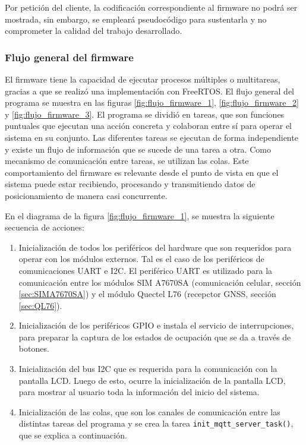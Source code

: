 Por petición del cliente, la codificación correspondiente al firmware no podrá ser mostrada, sin embargo, se empleará pseudocódigo para sustentarla y no comprometer la calidad del trabajo desarrollado. 

\subsubsection{Flujo general del firmware}

El firmware tiene la capacidad de ejecutar procesos múltiples o multitareas, gracias a que se realizó una implementación con FreeRTOS. El flujo general del programa se muestra en las figuras \ref{fig:flujo_firmware_1}, \ref{fig:flujo_firmware_2} y \ref{fig:flujo_firmware_3}. El programa se dividió en tareas, que son funciones puntuales que ejecutan una acción concreta y colaboran entre sí para operar el sistema en su conjunto. Las diferentes tareas se ejecutan de forma independiente y existe un flujo de información que se sucede de una tarea a otra. Como mecanismo de comunicación entre tareas, se utilizan las colas. Este comportamiento del firmware es relevante desde el punto de vista en que el sistema puede estar recibiendo, procesando y transmitiendo datos de posicionamiento de manera casi concurrente.

En el diagrama de la figura \ref{fig:flujo_firmware_1}, se muestra la siguiente secuencia de acciones: 

\begin{enumerate}
\item Inicialización de todos los periféricos del hardware que son requeridos para operar con los módulos externos. Tal es el caso de los periféricos de comunicaciones UART e I2C. El periférico UART es utilizado para la comunicación entre los módulos SIM A7670SA \citep{A7670SA} (comunicación celular, sección \ref{sec:SIMA7670SA}) y el módulo Quectel L76 (recepctor GNSS, sección \ref{sec:QL76}).

\item Inicialización de los periféricos GPIO e instala el servicio de interrupciones, para preparar la captura de los estados de ocupación que se da a través de botones.

\item Inicialización del bus I2C que es requerida para la comunicación con la pantalla LCD. Luego de esto, ocurre la inicialización de la pantalla LCD, para mostrar al usuario toda la información del inicio del sistema.

\item Inicialización de las colas, que son los canales de comunicación entre las distintas tareas del programa y se crea la tarea \verb|init_mqtt_server_task()|, que se explica a continuación. 

\end{enumerate}

